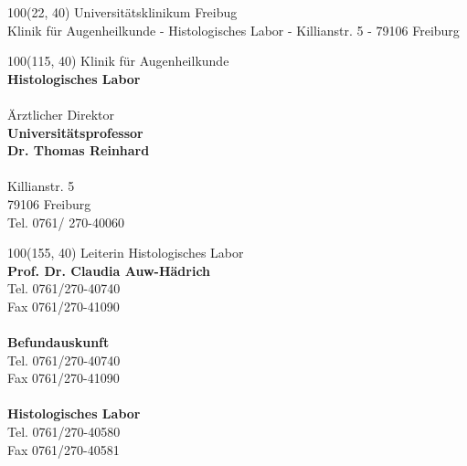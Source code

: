 \documentclass[12pt]{g-brief}
\begin{document}
\baselineskip10pt

\textblockorigin{0in}{0in}
\setlength{\TPHorizModule}{1mm}
\setlength{\TPVertModule}{1mm}

{

\begin{textblock}{100}(22, 40) 
\noindent 
\scriptsize
Universitätsklinikum Freibug\\
\tiny
Klinik für Augenheilkunde - Histologisches Labor - Killianstr. 5 - 79106 Freiburg
\end{textblock}
}



{
\scriptsize
\begin{textblock}{100}(115, 40) 
Klinik für Augenheilkunde \\
\textbf{Histologisches Labor}\\\\
Ärztlicher Direktor\\
\textbf{Universitätsprofessor\\
Dr. Thomas Reinhard}\\\\
Killianstr. 5\\
79106 Freiburg\\
Tel. 0761/ 270-40060\\
\end{textblock}
}

{
\scriptsize
\begin{textblock}{100}(155, 40) 
Leiterin Histologisches Labor\\
\textbf{Prof. Dr. Claudia Auw-Hädrich}\\
Tel. 0761/270-40740\\
Fax 0761/270-41090\\\\
\textbf{Befundauskunft}\\
Tel. 0761/270-40740\\
Fax 0761/270-41090\\\\
\textbf{Histologisches Labor}\\
Tel. 0761/270-40580\\
Fax 0761/270-40581
\end{textblock}
}

\begin{g-brief}
 \end{g-brief}
\end{document}
